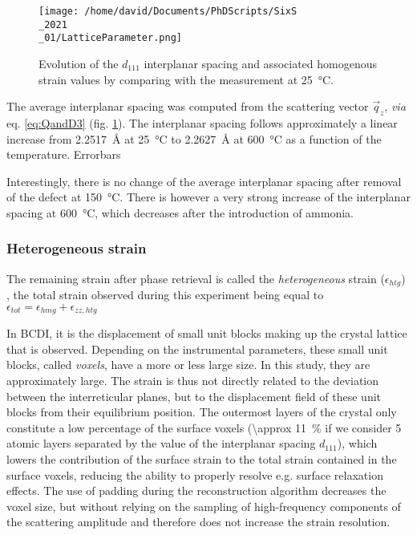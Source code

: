 \begin{figure}[!htb]
    \centering
    \texttt{[image: /home/david/Documents/PhDScripts/SixS\\\_2021\\\_01/LatticeParameter.png]}
    \caption{
        Evolution of the $d_{111}$ interplanar spacing and associated homogenous strain values by comparing with the measurement at \qty{25}{\degreeCelsius}.
    }
    \label{fig:HomoStrain}
\end{figure}

The average interplanar spacing was computed from the scattering vector $\vec{q}_z$, \textit{via} eq. \ref{eq:QandD3} (fig. \ref{fig:HomoStrain}).
The interplanar spacing follows approximately a linear increase from \qty{2.2517}{\angstrom} at \qty{25}{\degreeCelsius} to \qty{2.2627}{\angstrom} at \qty{600}{\degreeCelsius} as a function of the temperature.
\textcolor{Important}{Errorbars}

Interestingly, there is no change of the average interplanar spacing after removal of the defect at \qty{150}{\degreeCelsius}.
There is however a very strong increase of the interplanar spacing at \qty{600}{\degreeCelsius}, which decreases after the introduction of ammonia.

\subsubsection{Heterogeneous strain}

The remaining strain after phase retrieval is called the \textit{heterogeneous} strain ($\epsilon_{htg}$) \parencite{GREDIAC1996, FAVIER2007, Atlan2023}, the total strain observed during this experiment being equal to $\epsilon_{tot} = \epsilon_{hmg} + \epsilon_{zz, htg}$

In BCDI, it is the displacement of small unit blocks making up the crystal lattice that is observed.
Depending on the instrumental parameters, these small unit blocks, called \textit{voxels}, have a more or less large size.
In this study, they are approximately  large.
The strain is thus not directly related to the deviation between the interreticular planes, but to the displacement field of these unit blocks from their equilibrium position.
The outermost layers of the crystal only constitute a low percentage of the surface voxels (\qty{\approx 11}{\percent} if we consider 5 atomic layers separated by the value of the interplanar spacing $d_{111}$), which lowers the contribution of the surface strain to the total strain contained in the surface voxels, reducing the ability to properly resolve e.g. surface relaxation effects.
The use of padding during the reconstruction algorithm decreases the voxel size, but without relying on the sampling of high-frequency components of the scattering amplitude and therefore does not increase the strain resolution.

